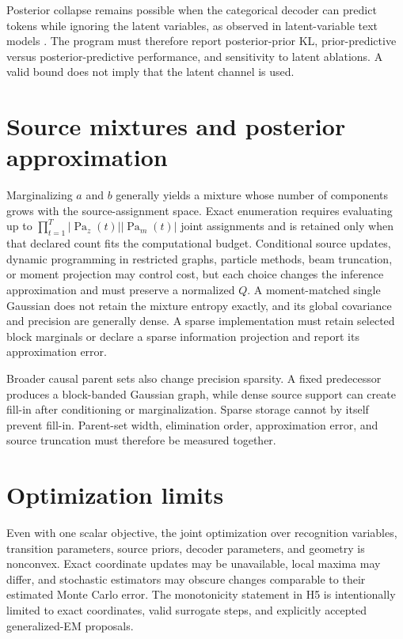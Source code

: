 Posterior collapse remains possible when the categorical decoder can predict tokens while ignoring the latent variables, as observed in latent-variable text models \citep{bowman2016generating}. The program must therefore report posterior-prior KL, prior-predictive versus posterior-predictive performance, and sensitivity to latent ablations. A valid bound does not imply that the latent channel is used.

\section{Source mixtures and posterior approximation}

Marginalizing $a$ and $b$ generally yields a mixture whose number of components grows with the source-assignment space. Exact enumeration requires evaluating up to $\prod_{t=1}^{T}|\operatorname{Pa}_z(t)||\operatorname{Pa}_m(t)|$ joint assignments and is retained only when that declared count fits the computational budget. Conditional source updates, dynamic programming in restricted graphs, particle methods, beam truncation, or moment projection may control cost, but each choice changes the inference approximation and must preserve a normalized $Q$. A moment-matched single Gaussian does not retain the mixture entropy exactly, and its global covariance and precision are generally dense. A sparse implementation must retain selected block marginals or declare a sparse information projection and report its approximation error.

Broader causal parent sets also change precision sparsity. A fixed predecessor produces a block-banded Gaussian graph, while dense source support can create fill-in after conditioning or marginalization. Sparse storage cannot by itself prevent fill-in. Parent-set width, elimination order, approximation error, and source truncation must therefore be measured together.

\section{Optimization limits}

Even with one scalar objective, the joint optimization over recognition variables, transition parameters, source priors, decoder parameters, and geometry is nonconvex. Exact coordinate updates may be unavailable, local maxima may differ, and stochastic estimators may obscure changes comparable to their estimated Monte Carlo error. The monotonicity statement in H5 is intentionally limited to exact coordinates, valid surrogate steps, and explicitly accepted generalized-EM proposals.

